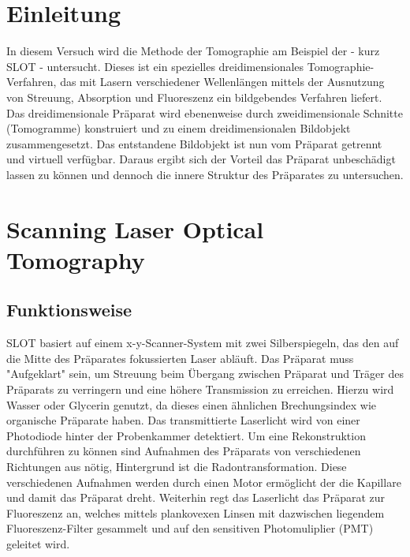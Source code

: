 



\section{Einleitung}
In diesem Versuch wird die Methode der Tomographie am Beispiel der  - kurz SLOT - untersucht. Dieses ist ein spezielles dreidimensionales Tomographie-Verfahren, das mit Lasern verschiedener Wellenlängen mittels der Ausnutzung von Streuung, Absorption und Fluoreszenz ein bildgebendes Verfahren liefert.\\

Das dreidimensionale Präparat wird ebenenweise durch zweidimensionale Schnitte (Tomogramme) konstruiert und zu einem dreidimensionalen Bildobjekt zusammengesetzt. Das entstandene Bildobjekt ist nun vom Präparat getrennt und virtuell verfügbar. Daraus ergibt sich der Vorteil das Präparat unbeschädigt lassen zu können und dennoch die innere Struktur des Präparates zu untersuchen.\\

\section{Scanning Laser Optical Tomography}
\subsection{Funktionsweise}
SLOT basiert auf einem x-y-Scanner-System mit zwei Silberspiegeln, das den auf die Mitte des Präparates fokussierten Laser abläuft. Das Präparat muss "Aufgeklart" sein, um Streuung beim Übergang zwischen Präparat und Träger des Präparats zu verringern und eine höhere Transmission zu erreichen. Hierzu wird Wasser oder Glycerin genutzt, da dieses einen ähnlichen Brechungsindex wie organische Präparate haben. Das transmittierte Laserlicht wird von einer Photodiode hinter der Probenkammer detektiert. Um eine Rekonstruktion durchführen zu können sind Aufnahmen des Präparats von verschiedenen Richtungen aus nötig, Hintergrund ist die Radontransformation. Diese verschiedenen Aufnahmen werden durch einen Motor ermöglicht der die Kapillare und damit das Präparat dreht. Weiterhin regt das Laserlicht das Präparat zur Fluoreszenz an, welches mittels plankovexen Linsen mit dazwischen liegendem Fluoreszenz-Filter gesammelt und auf den sensitiven Photomuliplier (PMT) geleitet wird.\\

